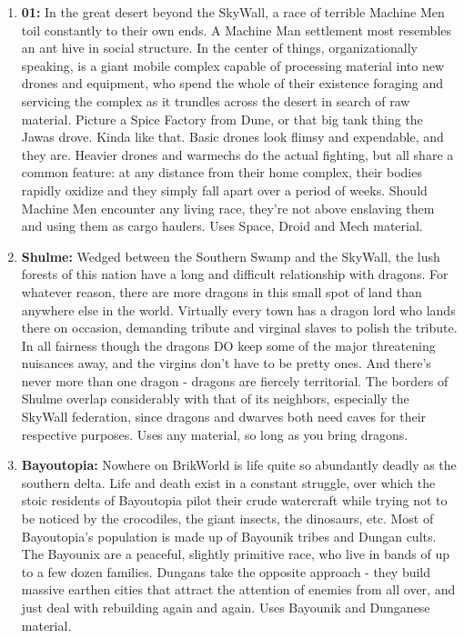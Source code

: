 \documentclass[12pt,a4paper,twocolumn]{article}
\begin{document}
\begin{enumerate}
\item {\bf 01:} In the great desert beyond the SkyWall, a race of terrible Machine Men toil constantly to their own ends.  A Machine Man settlement most resembles an ant hive in social structure.  In the center of things, organizationally speaking, is a giant mobile complex capable of processing material into new drones and equipment, who spend the whole of their existence foraging and servicing the complex as it trundles across the desert in search of raw material.  Picture a Spice Factory from Dune, or that big tank thing the Jawas drove.  Kinda like that.  Basic drones look flimsy and expendable, and they are.  Heavier drones and warmechs do the actual fighting, but all share a common feature: at any distance from their home complex, their bodies rapidly oxidize and they simply fall apart over a period of weeks.  Should Machine Men encounter any living race, they're not above enslaving them and using them as cargo haulers.  Uses Space, Droid and Mech material.

\item {\bf Shulme:} Wedged between the Southern Swamp and the SkyWall, the lush forests of this nation have a long and difficult relationship with dragons.  For whatever reason, there are more dragons in this small spot of land than anywhere else in the world.  Virtually every town has a dragon lord who lands there on occasion, demanding tribute and virginal slaves to polish the tribute.  In all fairness though the dragons DO keep some of the major threatening nuisances away, and the virgins don't have to be pretty ones.  And there's never more than one dragon - dragons are fiercely territorial.  The borders of Shulme overlap considerably with that of its neighbors, especially the SkyWall federation, since dragons and dwarves both need caves for their respective purposes.  Uses any material, so long as you bring dragons. 

\item {\bf Bayoutopia:} Nowhere on BrikWorld is life quite so abundantly deadly as the southern delta.  Life and death exist in a constant struggle, over which the stoic residents of Bayoutopia pilot their crude watercraft while trying not to be noticed by the crocodiles, the giant insects, the dinosaurs, etc.  Most of Bayoutopia's population is made up of Bayounik tribes and Dungan cults.  The Bayounix are a peaceful, slightly primitive race, who live in bands of up to a few dozen families.  Dungans take the opposite approach - they build massive earthen cities that attract the attention of enemies from all over, and just deal with rebuilding again and again.  Uses Bayounik and Dunganese material. 


\end{enumerate}
\end{document}
